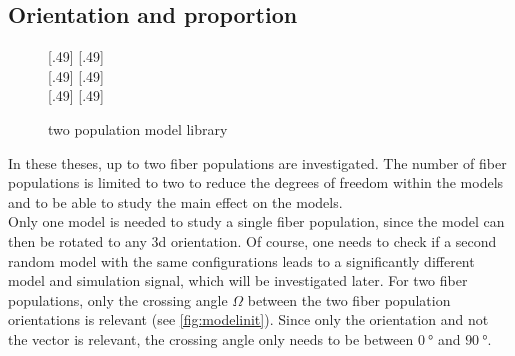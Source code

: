 \subsection{Orientation and proportion}\label{sec:modelParamet}
% 
\begin{figure}[p]
\centering
\setlength{\tikzwidth}{0.40\textwidth}
[.49\textwidth]{}\hfill
{}
[.49\textwidth]{}
\\

[.49\textwidth]{}\hfill
{}
[.49\textwidth]{}
\\
% 
\setlength{\tikzwidth}{0.40\textwidth}
[.49\textwidth]{}\hfill
{}
[.49\textwidth]{}
\caption{two population model library }
\label{fig:twomodelpopdesign}
\end{figure}
% 
In these theses, up to two fiber populations are investigated.
The number of fiber populations is limited to two to reduce the degrees of freedom within the models and to be able to study the main effect on the models.
\\
% 
Only one model is needed to study a single fiber population, since the model can then be rotated to any 3d orientation.
Of course, one needs to check if a second random model with the same configurations leads to a significantly different model and simulation signal, which will be investigated later.
For two fiber populations, only the crossing angle $\Omega$ between the two fiber population orientations is relevant (see \cref{fig:modelinit}).
Since only the orientation and not the vector is relevant, the crossing angle only needs to be between $\SI{0}{\degree}$ and $\SI{90}{\degree}$.

